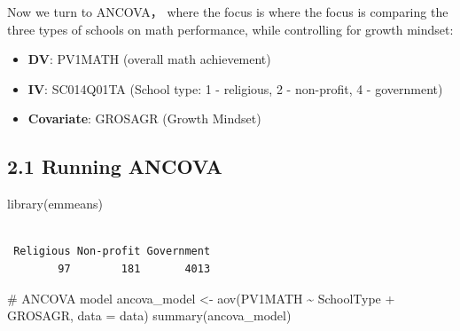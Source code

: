 \documentclass[
  letterpaper,
  DIV=11,
  numbers=noendperiod]{scrreprt}
\newenvironment{Shaded}{\begin{snugshade}}{\end{snugshade}}
\newcommand{\AttributeTok}[1]{\textcolor[rgb]{0.40,0.45,0.13}{#1}}
\newcommand{\CommentTok}[1]{\textcolor[rgb]{0.37,0.37,0.37}{#1}}
\newcommand{\DecValTok}[1]{\textcolor[rgb]{0.68,0.00,0.00}{#1}}
\newcommand{\FunctionTok}[1]{\textcolor[rgb]{0.28,0.35,0.67}{#1}}
\newcommand{\NormalTok}[1]{\textcolor[rgb]{0.00,0.23,0.31}{#1}}
\newcommand{\OtherTok}[1]{\textcolor[rgb]{0.00,0.23,0.31}{#1}}
\newcommand{\SpecialCharTok}[1]{\textcolor[rgb]{0.37,0.37,0.37}{#1}}
\newcommand{\StringTok}[1]{\textcolor[rgb]{0.13,0.47,0.30}{#1}}
\begin{document}
Now we turn to ANCOVA， where the focus is where the focus is comparing
the three types of schools on math performance, while controlling for
growth mindset:

\begin{itemize}
\item
  \textbf{DV}: PV1MATH (overall math achievement)
\item
  \textbf{IV}: SC014Q01TA (School type: 1 - religious, 2 - non-profit, 4
  - government)
\item
  \textbf{Covariate}: GROSAGR (Growth Mindset)
\end{itemize}

\subsection*{2.1 Running ANCOVA}\label{running-ancova}

\begin{Shaded}
\begin{Highlighting}[]
\FunctionTok{library}\NormalTok{(emmeans) }
\end{Highlighting}
\end{Shaded}

\begin{Shaded}
\end{Shaded}

\begin{verbatim}

 Religious Non-profit Government 
        97        181       4013 
\end{verbatim}

\begin{Shaded}
\begin{Highlighting}[]
\CommentTok{\# ANCOVA model }
\NormalTok{ancova\_model }\OtherTok{\textless{}{-}} \FunctionTok{aov}\NormalTok{(PV1MATH }\SpecialCharTok{\textasciitilde{}}\NormalTok{ SchoolType }\SpecialCharTok{+}\NormalTok{ GROSAGR, }\AttributeTok{data =}\NormalTok{ data) }
\FunctionTok{summary}\NormalTok{(ancova\_model) }
\end{Highlighting}
\end{Shaded}
\end{document}
